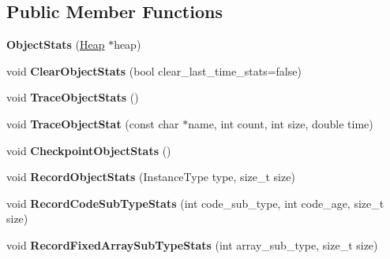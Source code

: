 \subsection*{Public Member Functions}
\begin{DoxyCompactItemize}
\item 
{\bfseries Object\+Stats} (\hyperlink{classv8_1_1internal_1_1_heap}{Heap} $\ast$heap)\hypertarget{classv8_1_1internal_1_1_object_stats_a78adee874f8f1284f4caa2ac11aefb60}{}\label{classv8_1_1internal_1_1_object_stats_a78adee874f8f1284f4caa2ac11aefb60}

\item 
void {\bfseries Clear\+Object\+Stats} (bool clear\+\_\+last\+\_\+time\+\_\+stats=false)\hypertarget{classv8_1_1internal_1_1_object_stats_ab745f971849d58bd37b0a0d956e5564e}{}\label{classv8_1_1internal_1_1_object_stats_ab745f971849d58bd37b0a0d956e5564e}

\item 
void {\bfseries Trace\+Object\+Stats} ()\hypertarget{classv8_1_1internal_1_1_object_stats_aec008d43332435be0ef74f509ce8b3b0}{}\label{classv8_1_1internal_1_1_object_stats_aec008d43332435be0ef74f509ce8b3b0}

\item 
void {\bfseries Trace\+Object\+Stat} (const char $\ast$name, int count, int size, double time)\hypertarget{classv8_1_1internal_1_1_object_stats_a230070de19efb34173a8c96346841e97}{}\label{classv8_1_1internal_1_1_object_stats_a230070de19efb34173a8c96346841e97}

\item 
void {\bfseries Checkpoint\+Object\+Stats} ()\hypertarget{classv8_1_1internal_1_1_object_stats_a14203f3ab5defd5efc18d334430cdc66}{}\label{classv8_1_1internal_1_1_object_stats_a14203f3ab5defd5efc18d334430cdc66}

\item 
void {\bfseries Record\+Object\+Stats} (Instance\+Type type, size\+\_\+t size)\hypertarget{classv8_1_1internal_1_1_object_stats_a230437ed3e9bf4a15dc6c42f96386f33}{}\label{classv8_1_1internal_1_1_object_stats_a230437ed3e9bf4a15dc6c42f96386f33}

\item 
void {\bfseries Record\+Code\+Sub\+Type\+Stats} (int code\+\_\+sub\+\_\+type, int code\+\_\+age, size\+\_\+t size)\hypertarget{classv8_1_1internal_1_1_object_stats_abb9d2289f7e9cd734a1ea4778d9ba346}{}\label{classv8_1_1internal_1_1_object_stats_abb9d2289f7e9cd734a1ea4778d9ba346}

\item 
void {\bfseries Record\+Fixed\+Array\+Sub\+Type\+Stats} (int array\+\_\+sub\+\_\+type, size\+\_\+t size)\hypertarget{classv8_1_1internal_1_1_object_stats_a33d4f3761145568e640b4cd9a47b2039}{}\label{classv8_1_1internal_1_1_object_stats_a33d4f3761145568e640b4cd9a47b2039}


\end{DoxyCompactItemize}
